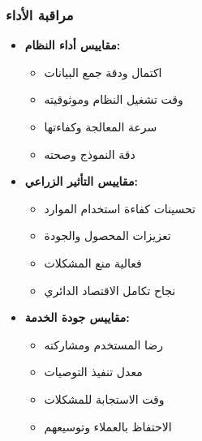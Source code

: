 \subsubsection{مراقبة الأداء}
\begin{itemize}
    \item \textbf{مقاييس أداء النظام:}
    \begin{itemize}
        \item اكتمال ودقة جمع البيانات
        \item وقت تشغيل النظام وموثوقيته
        \item سرعة المعالجة وكفاءتها
        \item دقة النموذج وصحته
    \end{itemize}
    
    \item \textbf{مقاييس التأثير الزراعي:}
    \begin{itemize}
        \item تحسينات كفاءة استخدام الموارد
        \item تعزيزات المحصول والجودة
        \item فعالية منع المشكلات
        \item نجاح تكامل الاقتصاد الدائري
    \end{itemize}
    
    \item \textbf{مقاييس جودة الخدمة:}
    \begin{itemize}
        \item رضا المستخدم ومشاركته
        \item معدل تنفيذ التوصيات
        \item وقت الاستجابة للمشكلات
        \item الاحتفاظ بالعملاء وتوسيعهم
    \end{itemize}
\end{itemize}

